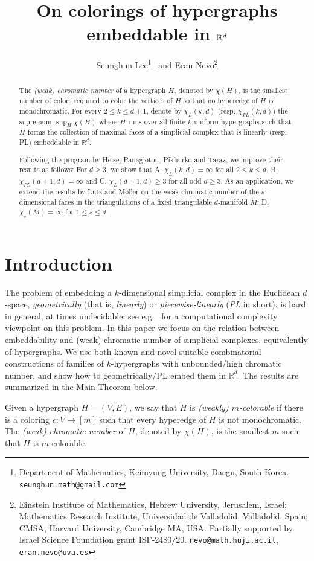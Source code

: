 \documentclass{article}
\title{On colorings of hypergraphs embeddable in $\RR^d$}
\date{}
\author{Seunghun Lee\footnote{
		Department of Mathematics, Keimyung University, Daegu, South Korea.
    \texttt{seunghun.math@gmail.com}} 
	\ and Eran Nevo\footnote{
		Einstein Institute of Mathematics, Hebrew University, Jerusalem, Israel;  
        Mathematics Research Institute, Universidad de Valladolid, Valladolid, Spain; CMSA, Harvard University, Cambridge MA, USA. 
        Partially supported by Israel Science Foundation grant ISF-2480/20. \texttt{nevo@math.huji.ac.il}, \texttt{eran.nevo@uva.es}}
}
\newcommand{\RR}{\mathbb{R}}
\theoremstyle{definition}
\begin{document}
	\maketitle
\begin{abstract}
	The \textit{(weak) chromatic number} of a hypergraph $H$, denoted by $\chi(H)$, is the smallest number of colors required to color the vertices of $H$
 so that no hyperedge of $H$ is monochromatic. For every $2\le k\le d+1$, denote by $\chi_L(k,d)$ (resp. $\chi_{PL}(k,d)$) the supremum 
$\sup_H \chi(H)$ where $H$ runs over all finite $k$-uniform hypergraphs such that $H$ forms the collection of maximal faces of a simplicial complex that is linearly (resp. PL) embeddable in $\RR^d$.

Following the program by Heise, Panagiotou, Pikhurko and Taraz, we improve their results as follows:
For $d \geq 3$, we show that A.  $\chi_L(k,d)=\infty$ for all $2\le k\le d$, B. $\chi_{PL}(d+1,d)=\infty$ and C. $\chi_L(d+1,d)\ge 3$ for all odd $d\ge 3$. 
As an application, we extend the results by Lutz and M\o ller on the weak chromatic number of the $s$-dimensional faces in the triangulations of a fixed triangulable $d$-manifold $M$:
D. $\chi_s(M)=\infty$ for $1\leq s \leq d$.
\end{abstract}
\section{Introduction}
The problem of embedding a $k$-dimensional simplicial complex in the Euclidean $d$-space, \textit{geometrically} (that is, \textit{linearly}) or \textit{piecewise-linearly} (\textit{PL} in short), is hard in general, at times undecidable; see e.g.~\cite{Hardness-of-embedding-simplicial-complexes,hardness-geometric-embeddability} for a computational complexity viewpoint on this problem. In this paper we focus on the relation between embeddability and (weak) chromatic number of simplicial complexes, equivalently of hypergraphs.
We use both known and novel suitable combinatorial constructions of families of $k$-hypergraphs with unbounded/high chromatic number, and show how to geometrically/PL embed them in $\RR^d$. The results are summarized in the Main Theorem below.

\smallskip

Given a hypergraph $H=(V,E)$, we say that $H$ is \textit{(weakly) $m$-colorable} if there is a coloring $c:V\to [m]$ such that every hyperedge of $H$ is not monochromatic. The \textit{(weak) chromatic number} of $H$, denoted by $\chi(H)$, is the smallest $m$ such that $H$ is $m$-colorable.
\end{document}
